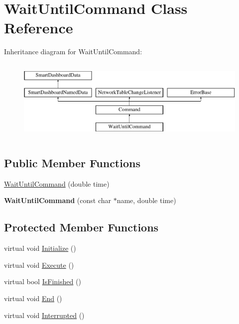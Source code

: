 \hypertarget{classWaitUntilCommand}{
\section{WaitUntilCommand Class Reference}
\label{classWaitUntilCommand}
}
Inheritance diagram for WaitUntilCommand:\begin{figure}[H]
\begin{center}
\leavevmode
\includegraphics[height=4.000000cm]{classWaitUntilCommand}
\end{center}
\end{figure}
\subsection*{Public Member Functions}
\begin{DoxyCompactItemize}
\item 
\hyperlink{classWaitUntilCommand_a00e1d34ff59ae250e16362684f7ae728}{WaitUntilCommand} (double time)
\item 
\hypertarget{classWaitUntilCommand_adb3ccebc9ac0d3983b51c1a6832be3d4}{
{\bfseries WaitUntilCommand} (const char $\ast$name, double time)}
\label{classWaitUntilCommand_adb3ccebc9ac0d3983b51c1a6832be3d4}

\end{DoxyCompactItemize}
\subsection*{Protected Member Functions}
\begin{DoxyCompactItemize}
\item 
virtual void \hyperlink{classWaitUntilCommand_a30821833969223f43bbd99aaec21c8e8}{Initialize} ()
\item 
virtual void \hyperlink{classWaitUntilCommand_aeecc3b6e8fe480786bbb40a486e9812e}{Execute} ()
\item 
virtual bool \hyperlink{classWaitUntilCommand_aa176f72313e401526cd617714fe4594f}{IsFinished} ()
\item 
virtual void \hyperlink{classWaitUntilCommand_aba53383b0516939f352f86aef61467c0}{End} ()
\item 
virtual void \hyperlink{classWaitUntilCommand_ac60f29d6f35a3f40375536ec7f8c0141}{Interrupted} ()
\end{DoxyCompactItemize}


